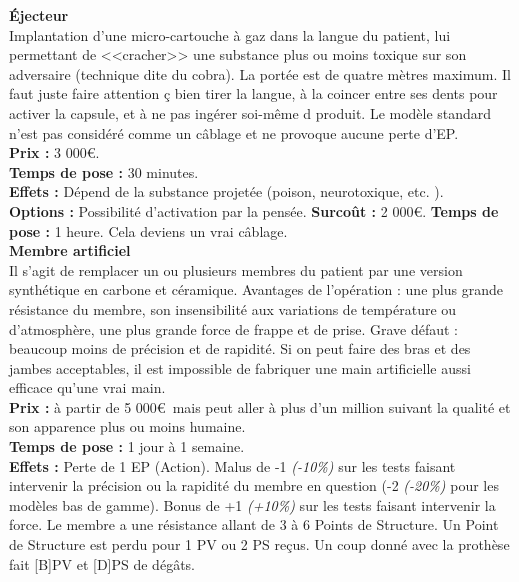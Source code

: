 \documentclass[11pt,twoside,a4paper]{article}
\begin{document}
\begin{multicols*}{2}
\textbf{{\'E}jecteur}~\\
Implantation d'une micro-cartouche {\`a} gaz dans la langue du patient, lui permettant de <<cracher>> une substance plus ou moins toxique sur son adversaire (technique dite du cobra). La port{\'e}e est de quatre m{\`e}tres maximum. Il faut juste faire attention \c{c} bien tirer la langue, {\`a} la coincer entre ses dents pour activer la capsule, et {\`a} ne pas ing{\'e}rer soi-m{\^e}me d produit. Le mod{\`e}le standard n'est pas consid{\'e}r{\'e} comme un c{\^a}blage et ne provoque aucune perte d'EP. ~\\
{\small 
	\textbf{Prix : }3 000\euro . ~\\
	\textbf{Temps de pose : }30 minutes. ~\\
	\textbf{Effets : }D{\'e}pend de la substance projet{\'e}e (poison, neurotoxique, etc. ). ~\\
	\textbf{Options : }Possibilit{\'e} d'activation par la pens{\'e}e. \textbf{Surco{\^u}t : } 2 000\euro . \textbf{Temps de pose : }1 heure. Cela deviens un vrai c{\^a}blage. %
} ~\\


\textbf{Membre artificiel}~\\
Il s'agit de remplacer un ou plusieurs membres du patient par une version synth{\'e}tique en carbone et c{\'e}ramique. Avantages de l'op{\'e}ration : une plus grande r{\'e}sistance du membre, son insensibilit{\'e} aux variations de temp{\'e}rature ou d'atmosph{\`e}re, une plus grande force de frappe et de prise. Grave d{\'e}faut : beaucoup moins de pr{\'e}cision et de rapidit{\'e}. Si on peut faire des bras et des jambes acceptables, il est impossible de fabriquer une main artificielle aussi efficace qu'une vrai main. ~\\
{\small 
	\textbf{Prix : }{\`a} partir de 5 000\euro ~mais peut aller {\`a} plus d'un million suivant la qualit{\'e} et son apparence plus ou moins humaine. ~\\
	\textbf{Temps de pose : }1 jour {\`a} 1 semaine. ~\\
	\textbf{Effets : }Perte de 1 EP (Action). Malus de -1 \emph{(-10\%)} sur les tests faisant intervenir la pr{\'e}cision ou la rapidit{\'e} du membre en question (-2 \emph{(-20\%)} pour les mod{\`e}les bas de gamme). Bonus de +1 \emph{(+10\%)} sur les tests faisant intervenir la force. Le membre a une r{\'e}sistance allant de 3 {\`a} 6 Points de Structure. Un Point de Structure est perdu pour 1 PV ou 2 PS re\c{c}us. Un coup donn{\'e} avec la proth{\`e}se fait [B]PV et [D]PS de d{\'e}g{\^a}ts. ~\\
} %


\end{multicols*}
\end{document}
